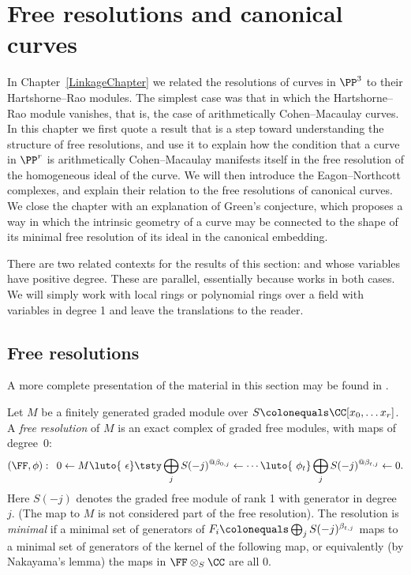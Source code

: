 

\chapter{Free resolutions and canonical curves}
\label{SyzygiesChapter}

\def\length{\mathrm{ length}}

In Chapter~\ref{LinkageChapter} we related the resolutions of curves
in $\PP^3$ to their Hartshorne--Rao modules. The simplest case was
that in which the Hartshorne--Rao module vanishes, that is, the case
of arithmetically Cohen--Macaulay curves. In this chapter we first
quote a result that is a step toward understanding the structure of
free resolutions, and use it to explain how the condition that a curve
in $\PP^r$ is arithmetically Cohen--Macaulay manifests itself in the
free resolution of the homogeneous ideal of the curve. We will then
introduce the Eagon--Northcott complexes, and explain their relation to
the free resolutions of canonical curves. We close the chapter with an
explanation of Green's conjecture, which proposes a way in which the
intrinsic geometry of a curve may be connected to the shape of its
minimal free resolution of its ideal in the canonical embedding.

There are two related contexts for the results of this section:
%
%
and
%
%
whose variables have positive degree. These are parallel, essentially
because
%
works in both cases. We will simply work
with local rings or polynomial rings over a field with variables in
degree 1 and leave the translations to the reader.

\section{Free resolutions}
A more complete presentation of the material in this section may be
found in \cite[Chapter 19]{Eisenbud1995}.

Let $M$ be a finitely generated graded module over $S \colonequals
\CC[x_0, \dots x_r]$. A \emph{free resolution} of $M$ is an
%
exact complex
%
of graded free modules, with maps of degree~0:
$$
\let\quad\enspace
(\FF, \phi):\quad 0\leftarrow M \luto{\ \epsilon}
\tsty\bigoplus_jS(-j)^{@\beta_{0,j}}
\leftarrow\cdots
\luto{\ \phi_t}\bigoplus_jS(-j)^{@\beta_{t,j}}\leftarrow 0.
$$
Here $S(-j)$ denotes the graded free module of rank 1 with generator in
degree~$j$.
(The map to $M$ is not considered part of the free resolution). The
resolution is \emph{minimal} if a minimal set of generators of $F_i
\index{minimal free resolution}%
\index{free resolution!minimal}%
\colonequals  \bigoplus_jS(-j)^{\beta_{t,j}}$ maps to a minimal set of
generators of the kernel of the following map,
or equivalently (by Nakayama's lemma) the maps in $\FF\otimes_S \CC$
%
are all 0.

